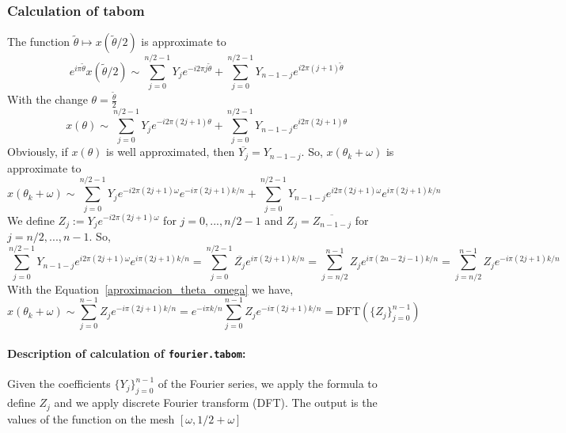 \documentclass{article}
\begin{document}
\subsubsection{Calculation of tabom}
The function $\tilde{\theta}\mapsto x(\tilde{\theta}/2)$ is approximate to 
\begin{equation} 
 e^{i\pi \tilde{\theta}}x(\tilde{\theta}/2)
\sim
\sum^{n/2-1}_{j=0} Y_j e^{-i 2\pi j \tilde{\theta}} +
\sum^{n/2-1}_{j=0} Y_{n-1-j} e^{i 2\pi (j+1) \tilde{\theta}}
\end{equation} 
With the change $ \theta=\frac{\tilde{\theta}}{2}$
\begin{equation}
x(\theta)\sim\sum^{n/2-1}_{j=0} Y_j e^{-i2\pi(2j+1) \theta} +
\sum^{n/2-1}_{j=0}Y_{n-1-j} e^{i2\pi(2j+1) \theta}
\end{equation}
Obviously, if $x(\theta)$ is well approximated, then
$\overline{Y_j}=Y_{n-1-j}$.
So, 
$x(\theta_k+\omega)$ is approximate to
\begin{equation}\label{aproximacion_theta_omega}
x(\theta_k+\omega)\sim 
\sum^{n/2-1}_{j=0} Y_j e^{-i2\pi(2j+1) \omega} e^{-i\pi(2j+1)k/n}+
\sum^{n/2-1}_{j=0} Y_{n-1-j} e^{i2\pi(2j+1) \omega} e^{i\pi(2j+1)k/n}
\end{equation}
We define  $Z_j:=Y_j e^{-i2\pi(2j+1) \omega}$ for $j=0,...,n/2-1$ and $Z_j=\overline{Z_{n-1-j}}$ for $j=n/2,...,n-1$.
 So,
\begin{equation}
\sum^{n/2-1}_{j=0} Y_{n-1-j} e^{i2\pi(2j+1) \omega} e^{i\pi(2j+1)k/n}=
\sum^{n/2-1}_{j=0} \overline{Z_j} e^{i\pi(2j+1)k/n}=
\sum^{n-1}_{j=n/2} Z_j e^{i\pi (2n-2j-1)k/n}= 
\sum^{n-1}_{j=n/2} Z_j e^{-i\pi (2j+1)k/n}
\end{equation}
With the Equation~\eqref{aproximacion_theta_omega} we have, 
\begin{equation}
x(\theta_k+\omega)\sim  \sum^{n-1}_{j=0} Z_j e^{-i\pi (2j+1)k/n}
= e^{-i\pi k/n}\sum^{n-1}_{j=0} Z_j e^{-i\pi (2j+1)k/n}=
\mbox{DFT}(\{Z_j\}_{j=0}^{n-1})
\end{equation}

\paragraph{Description of calculation of \texttt{fourier.tabom}:} Given the coefficients $\{Y_j\}_{j=0}^{n-1}$ of the
Fourier series, we apply the formula to define $Z_j$ and we apply
discrete Fourier transform (DFT). The output is the values of the
function on the mesh $[\omega,1/2+\omega]$
\end{document}
